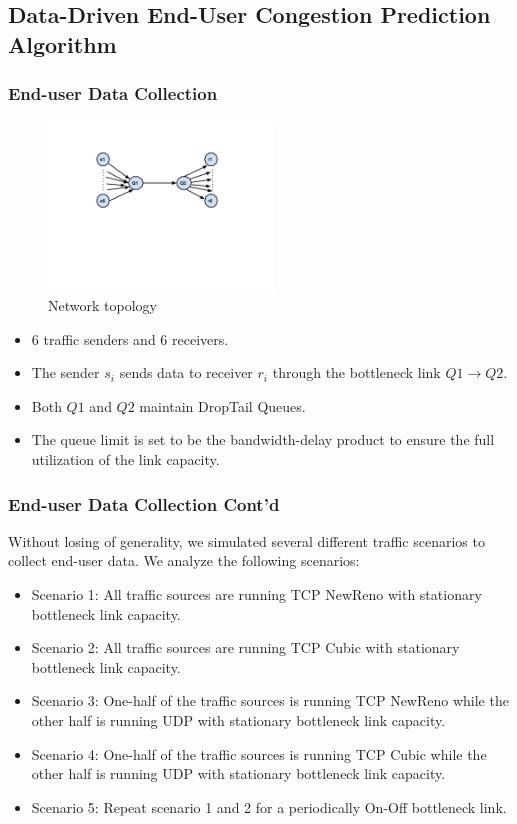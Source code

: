 \documentclass{beamer}
\begin{document}
\subsection{Data-Driven End-User Congestion Prediction Algorithm}
\begin{frame}
\frametitle{End-user Data Collection}
\begin{figure}
\centering
\includegraphics[width=6cm]{6layout.pdf}
\caption{Network topology}
\label{layout}
\end{figure}
\begin{itemize}
\item $6$ traffic senders and $6$ receivers.
\item The sender $s_{i}$ sends data to receiver $r_{i}$ through the bottleneck link $Q1\to Q2$. 
\item Both $Q1$ and $Q2$ maintain DropTail Queues. 
\item The queue limit is set to be the bandwidth-delay product to ensure the full utilization of the link capacity.
\end{itemize}
\end{frame}
\begin{frame}
\frametitle{End-user Data Collection Cont'd}
Without losing of generality, we simulated several different traffic scenarios to collect end-user data. We analyze the following scenarios: 
\begin{itemize}
    \item Scenario 1: All traffic sources are running TCP NewReno with stationary bottleneck link capacity.
    \item Scenario 2: All traffic sources are running TCP Cubic with stationary bottleneck link capacity.
    \item Scenario 3: One-half of the traffic sources is running TCP NewReno while the other half is running UDP with stationary bottleneck link capacity.
    \item Scenario 4: One-half of the traffic sources is running TCP Cubic while the other half is running UDP with stationary bottleneck link capacity.
    \item Scenario 5: Repeat scenario 1 and 2 for a periodically On-Off bottleneck link.
\end{itemize}
\end{frame}
\end{document}
